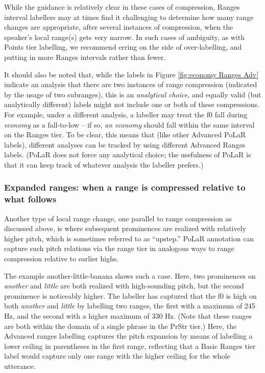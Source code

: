 \documentclass[11pt, twoside]{memoir}
\def\langtext#1{\textit{#1}}
\def\langtextquot#1{\langtext{#1}}
\begin{document}
While the guidance is relatively clear in these cases of compression, Ranges interval labellers may at times find it challenging to determine how many range changes are appropriate, after several instances of compression, when the speaker’s local range(s) gets very narrow. In such cases of ambiguity, as with Points tier labelling, we recommend erring on the side of over-labelling, and putting in more Ranges intervals rather than fewer.

It should also be noted that, while the labels in Figure \ref{fig:economy Ranges Adv} indicate an analysis that there are two instances of range compression (indicated by the usage of two subranges), this is an \emph{analytical choice}, and equally valid (but analytically different) labels might not include one or both of these compressions. For example, under a different analysis, a labeller may treat the f0 fall during \langtextquot{economy} as a fall-to-low – if so, \langtextquot{an economy} should fall within the same interval on the Ranges tier. To be clear, this means that (like other Advanced PoLaR labels), different analyses can be tracked by using different Advanced Ranges labels. (PoLaR does not force any analytical choice; the usefulness of PoLaR is that it can keep track of whatever analysis the labeller prefers.)

\subsubsection{Expanded ranges: when a range is compressed relative to what follows}\label{sec:expanded-ranges-when-a-range-is-compressed-relative-to-what-follows}

Another type of local range change, one parallel to range compression as discussed above, is where subsequent prominences are realized with relatively higher pitch, which is sometimes referred to as “upstep.” PoLaR annotation can capture such pitch relations via the range tier in analogous ways to range compression relative to earlier highs.

The example another-little-banana shows such a case. Here, two prominences on \langtext{another} and \langtext{little} are both realized with high-sounding pitch, but the second prominence is noticeably higher. The labeller has captured that the f0 is high on both \langtext{another} and \langtext{little} by labelling two ranges, the first with a maximum of 245 Hz, and the second with a higher maximum of 330 Hz. (Note that these ranges are both within the domain of a single phrase in the PrStr tier.) Here, the Advanced ranges labelling captures the pitch expansion by means of labelling a lower ceiling in parentheses in the first range, reflecting that a Basic Ranges tier label would capture only one range with the higher ceiling for the whole utterance.
\end{document}
